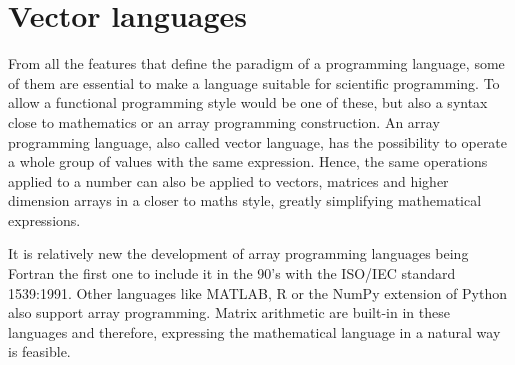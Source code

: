  
 
 
    \section{Vector languages} \label{sec:veclan}
 
From all the features that define the paradigm of a programming language, 
some of them are essential to make a language suitable for scientific programming.
To allow a functional programming style would be one of these, 
but also a syntax close to mathematics 
or an array programming construction. 
An array programming language, also called vector language, has the possibility 
to operate a whole group of values with the same expression.
Hence, the same operations applied to a number can also be applied to vectors, matrices and higher dimension arrays
in a closer to maths style, greatly simplifying mathematical expressions.

It is relatively new the development of array programming languages 
being Fortran the first one to include it in the 90's with the ISO/IEC standard 1539:1991. 
Other languages like MATLAB, R or the NumPy extension of Python also support array programming.
Matrix arithmetic are built-in in these languages and therefore, 
expressing the mathematical language in a natural way is feasible.

